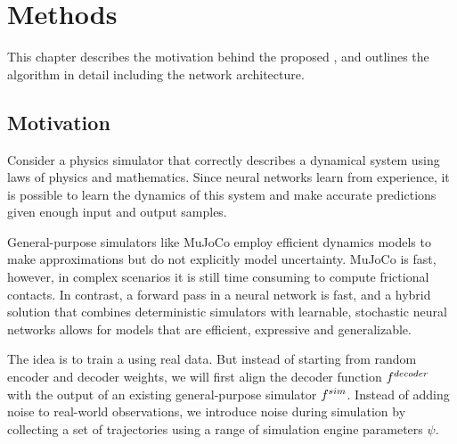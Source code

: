 \chapter{Methods}
\label{methods}

This chapter describes the motivation behind the proposed \dettostoc{}, and outlines the algorithm in detail including the network architecture.

\section{Motivation}


Consider a physics simulator that correctly describes a dynamical system using laws of physics and mathematics. Since neural networks learn from experience, it is possible to learn the dynamics of this system and make accurate predictions given enough input and output samples.


General-purpose simulators like MuJoCo employ efficient dynamics models to make approximations but do not explicitly model uncertainty. MuJoCo is fast, however, in complex scenarios it is still time consuming to compute frictional contacts. In contrast, a forward pass in a neural network is fast, and a hybrid solution that combines deterministic simulators with learnable, stochastic neural networks allows for models that are efficient, expressive and generalizable.


The idea is to train a \cvae{} using real data. But instead of starting from random encoder and decoder weights, we will first align the decoder function $f^{decoder}{}$ with the output of an existing general-purpose simulator $f^{sim}{}$. Instead of adding noise to real-world observations, we introduce noise during simulation by collecting a set of trajectories using a range of simulation engine parameters $\psi$.

